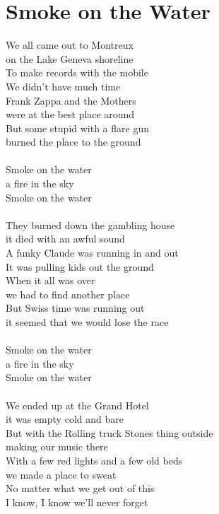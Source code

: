 \section{Smoke on the Water}
We all came out to Montreux\\
on the Lake Geneva shoreline\\
To make records with the mobile\\
We didn't have much time\\
Frank Zappa and the Mothers\\
were at the best place around\\
But some stupid with a flare gun\\
burned the place to the ground\\
\\
Smoke on the water\\
a fire in the sky\\
Smoke on the water\\
\\
They burned down the gambling house\\
it died with an awful sound\\
A funky Claude was running in and out\\
It was pulling kids out the ground\\
When it all was over\\
we had to find another place\\
But Swiss time was running out\\
it seemed that we would lose the race\\
\\
Smoke on the water\\
a fire in the sky\\
Smoke on the water\\
\\
We ended up at the Grand Hotel\\
it was empty cold and bare\\
But with the Rolling truck Stones thing outside\\
making our music there\\
With a few red lights and a few old beds\\
we made a place to sweat\\
No matter what we get out of this\\
I know, I know we'll never forget\\